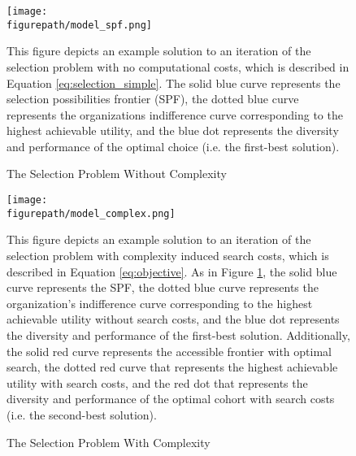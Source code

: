 
\begin{figure}[!htb]
    \centering
        \caption{The Selection Problem Without Complexity}\label{fig:model_spf}
      \texttt{[image: \\figurepath/model\_spf.png]} 
        \begin{notes}
    This figure depicts an example solution to an iteration of the selection problem with no computational costs, which is described in Equation \ref{eq:selection_simple}. The solid blue curve represents the selection possibilities frontier (SPF), the dotted blue curve represents the organizations indifference curve corresponding to the highest achievable utility, and the blue dot represents the diversity and performance of the optimal choice (i.e. the first-best solution). 
        \end{notes}
    \end{figure}
    
    \newpage
    \begin{figure}[!htb]
    \centering
        \caption{The Selection Problem With Complexity}\label{fig:model_complex}
      \texttt{[image: \\figurepath/model\_complex.png]} 
        \begin{notes}
    This figure depicts an example solution to an iteration of the selection problem with complexity induced search costs, which is described in Equation \ref{eq:objective}. As in Figure \ref{fig:model_spf}, the solid blue curve represents the SPF, the dotted blue curve represents the organization's indifference curve corresponding to the highest achievable utility without search costs, and the blue dot represents the diversity and performance of the first-best solution. Additionally, the solid red curve represents the accessible frontier with optimal search, the dotted red curve that represents the highest achievable utility with search costs, and the red dot that represents the diversity and performance of the optimal cohort with search costs (i.e. the second-best solution).
        \end{notes}
    \end{figure}
    
